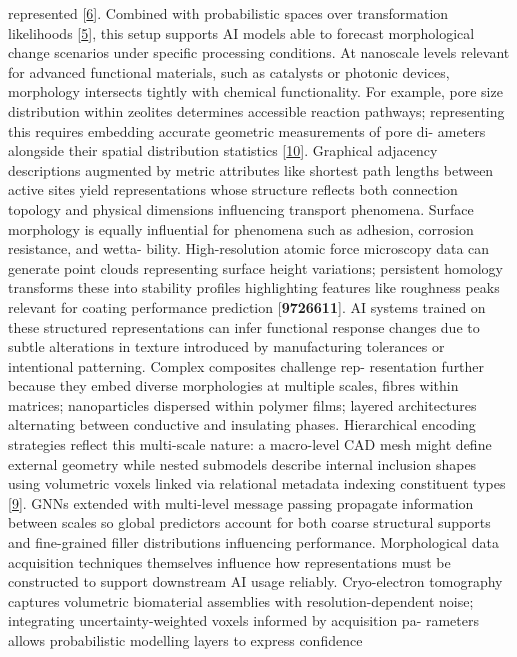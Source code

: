 \documentclass[
]{article}
\begin{document}
represented {[}\hyperref[_bookmark46]{6}{]}. Combined with probabilistic
spaces over transformation likelihoods {[}\hyperref[_bookmark45]{5}{]},
this setup supports AI models able to forecast morphological change
scenarios under specific processing conditions. At nanoscale levels
relevant for advanced functional materials, such as catalysts or
photonic devices, morphology intersects tightly with chemical
functionality. For example, pore size distribution within zeolites
determines accessible reaction pathways; representing this requires
embedding accurate geometric measurements of pore di- ameters alongside
their spatial distribution statistics {[}\hyperref[_bookmark50]{10}{]}.
Graphical adjacency descriptions augmented by metric attributes like
shortest path lengths between active sites yield representations whose
structure reflects both connection topology and physical dimensions
influencing transport phenomena. Surface morphology is equally
influential for phenomena such as adhesion, corrosion resistance, and
wetta- bility. High-resolution atomic force microscopy data can generate
point clouds representing surface height variations; persistent homology
transforms these into stability profiles highlighting features like
roughness peaks relevant for coating performance prediction
{[}\textbf{9726611}{]}. AI systems trained on these structured
representations can infer functional response changes due to subtle
alterations in texture introduced by manufacturing tolerances or
intentional patterning. Complex composites challenge rep- resentation
further because they embed diverse morphologies at multiple scales,
fibres within matrices; nanoparticles dispersed within polymer films;
layered architectures alternating between conductive and insulating
phases. Hierarchical encoding strategies reflect this multi-scale
nature: a macro-level CAD mesh might define external geometry while
nested submodels describe internal inclusion shapes using volumetric
voxels linked via relational metadata indexing constituent types
{[}\hyperref[_bookmark49]{9}{]}. GNNs extended with multi-level message
passing propagate information between scales so global predictors
account for both coarse structural supports and fine-grained filler
distributions influencing performance. Morphological data acquisition
techniques themselves influence how representations must be constructed
to support downstream AI usage reliably. Cryo-electron tomography
captures volumetric biomaterial assemblies with resolution-dependent
noise; integrating uncertainty-weighted voxels informed by acquisition
pa- rameters allows probabilistic modelling layers to express confidence
\end{document}
